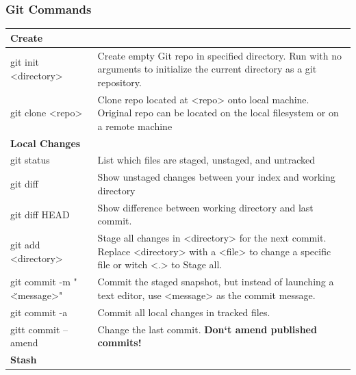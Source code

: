 \subsubsection{Git Commands}
\vspace{-0.5cm}
\begin{longtable}{| p{} | p{} |}
	\hline 
	\textbf{Create}&
	\\ \hline
	
	git init <directory>&
	Create empty Git repo in specified directory.\newline
	Run with no arguments to initialize the current directory as a git repository.
	\\ \hline 
	
	git clone <repo>& 
	Clone repo located at <repo> onto local machine.\newline
	Original repo can be located on the local filesystem or on a remote machine
	\\ \hline  \hline
	
	\textbf{Local Changes}&
	\\ \hline 
	
	\hline 
	git status&
	List which files are staged, unstaged, and untracked  
	\\ \hline
	
	git diff& 
	Show unstaged changes between your index and working
	directory 
	\\ \hline 
	
	git diff HEAD&
	Show difference between working directory and last commit.
	\\ \hline
	
	git add <directory>&
	Stage all changes in <directory> for the next commit. Replace <directory>
	with a <file> to change a specific file or witch <.> to Stage all.
	\\ \hline 
	
	git commit -m " \" <message>"&
	Commit the staged snapshot, but instead of launching a text editor, use
	<message> as the commit message.
	\\ \hline
	
	git commit -a&
	Commit all local changes in tracked files.  
	\\ \hline 
	
	gitt commit --amend&
	Change the last commit. \textbf{Don‘t amend published commits!}
	\\ \hline \hline
	
    \textbf{Stash}&
    \\ \hline
    

\end{longtable}
